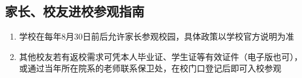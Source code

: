 \subsection[家长、校友进校参观指南]{家长、校友进校参观指南\footnotemark}
\begin{enumerate}
    \item 学校在每年8月30日前后允许家长参观校园\footnotemark，具体政策以学校官方说明为准
    \item 其他校友若有返校需求可凭本人毕业证、学生证等有效证件（电子版也可），或通过当年所在院系的老师联系保卫处，在校门口登记后即可入校参观


\end{enumerate}
